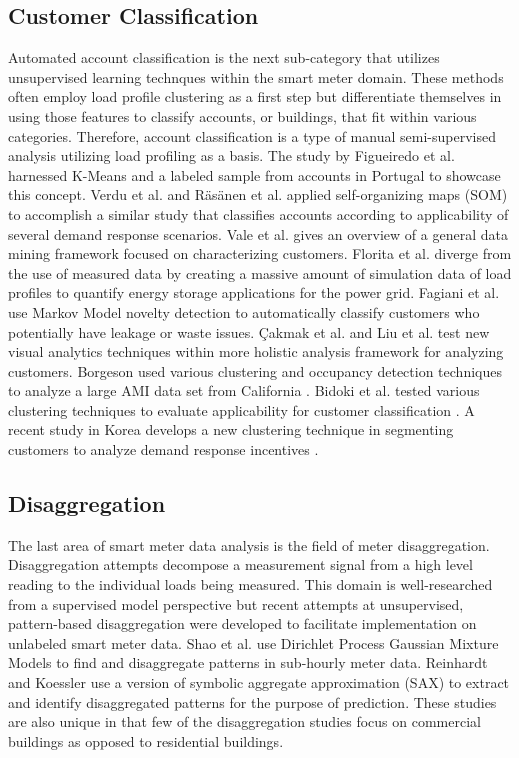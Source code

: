 \subsection{Customer Classification}
Automated account classification is the next sub-category that utilizes unsupervised learning technques within the smart meter domain. These methods often employ load profile clustering as a first step but differentiate themselves in using those features to classify accounts, or buildings, that fit within various categories. Therefore, account classification is a type of manual semi-supervised analysis utilizing load profiling as a basis. The study by Figueiredo et al. \cite{figueiredo_electric_2005} harnessed K-Means and a labeled sample from accounts in Portugal to showcase this concept. Verdu et al. \cite{verdu_classification_2006} and R\"as\"anen et al. \cite{rasanen_reducing_2008} applied self-organizing maps (SOM) to accomplish a similar study that classifies accounts according to applicability of several demand response scenarios. Vale et al. \cite{vale_data_2009} gives an overview of a general data mining framework focused on characterizing customers. Florita et al. \cite{florita_classification_2012} diverge from the use of measured data by creating a massive amount of simulation data of load profiles to quantify energy storage applications for the power grid. Fagiani et al. \cite{fagiani_novelty_2015} use Markov Model novelty detection to automatically classify customers who potentially have leakage or waste issues. \c Cakmak et al. \cite{cakmak_new_2014} and Liu et al. \cite{liu_smas:_2015} test new visual analytics techniques within more holistic analysis framework for analyzing customers. Borgeson used various clustering and occupancy detection techniques to analyze a large AMI data set from California \cite{borgeson_targeted_2013}. Bidoki et al. tested various clustering techniques to evaluate applicability for customer classification \cite{bidoki_evaluating_2010}. A recent study in Korea develops a new clustering technique in segmenting customers to analyze demand response incentives \cite{jang_variability_2016}.

\subsection{Disaggregation}
The last area of smart meter data analysis is the field of meter disaggregation. Disaggregation attempts decompose a measurement signal from a high level reading to the individual loads being measured. This domain is well-researched from a supervised model perspective but recent attempts at unsupervised, pattern-based disaggregation were developed to facilitate implementation on unlabeled smart meter data. Shao et al. \cite{shao_temporal_2013} use Dirichlet Process Gaussian Mixture Models to find and disaggregate patterns in sub-hourly meter data. Reinhardt and Koessler \cite{reinhardt_powersax:_2014} use a version of symbolic aggregate approximation (SAX) to extract and identify disaggregated patterns for the purpose of prediction. These studies are also unique in that few of the disaggregation studies focus on commercial buildings as opposed to residential buildings.

